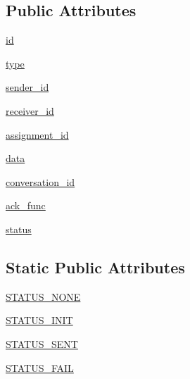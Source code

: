 \subsection*{Public Attributes}
\begin{DoxyCompactItemize}
\item 
\hyperlink{classparlai_1_1mturk_1_1core_1_1dev_1_1socket__manager_1_1Packet_a451091aed811f2901c213986fc86d020}{id}
\item 
\hyperlink{classparlai_1_1mturk_1_1core_1_1dev_1_1socket__manager_1_1Packet_acc5963f125182087b623a3adde523c89}{type}
\item 
\hyperlink{classparlai_1_1mturk_1_1core_1_1dev_1_1socket__manager_1_1Packet_a3095d75963017368974bd34c3aacfe8c}{sender\+\_\+id}
\item 
\hyperlink{classparlai_1_1mturk_1_1core_1_1dev_1_1socket__manager_1_1Packet_af453648a5280b925750d4305dcd2404a}{receiver\+\_\+id}
\item 
\hyperlink{classparlai_1_1mturk_1_1core_1_1dev_1_1socket__manager_1_1Packet_ae1819bd7ee66a1e798fbfd091ebf060e}{assignment\+\_\+id}
\item 
\hyperlink{classparlai_1_1mturk_1_1core_1_1dev_1_1socket__manager_1_1Packet_a55eb8eaaff74df589a544a1133434bac}{data}
\item 
\hyperlink{classparlai_1_1mturk_1_1core_1_1dev_1_1socket__manager_1_1Packet_a4214fa53d6892dbfaa37cf6e3503f945}{conversation\+\_\+id}
\item 
\hyperlink{classparlai_1_1mturk_1_1core_1_1dev_1_1socket__manager_1_1Packet_a8a1db141ef73f663d032aa493825b4a2}{ack\+\_\+func}
\item 
\hyperlink{classparlai_1_1mturk_1_1core_1_1dev_1_1socket__manager_1_1Packet_a322b2711fac3332dc676f1d7d3b04a35}{status}
\end{DoxyCompactItemize}
\subsection*{Static Public Attributes}
\begin{DoxyCompactItemize}
\item 
\hyperlink{classparlai_1_1mturk_1_1core_1_1dev_1_1socket__manager_1_1Packet_ac376411557dc210237bd5d0d19699627}{S\+T\+A\+T\+U\+S\+\_\+\+N\+O\+NE}
\item 
\hyperlink{classparlai_1_1mturk_1_1core_1_1dev_1_1socket__manager_1_1Packet_af742ed7464b244f1acbaced40e9d868c}{S\+T\+A\+T\+U\+S\+\_\+\+I\+N\+IT}
\item 
\hyperlink{classparlai_1_1mturk_1_1core_1_1dev_1_1socket__manager_1_1Packet_aa86e048363155438881eef8fd23e8ea6}{S\+T\+A\+T\+U\+S\+\_\+\+S\+E\+NT}
\item 
\hyperlink{classparlai_1_1mturk_1_1core_1_1dev_1_1socket__manager_1_1Packet_a7b0e2e95917a1e2a5cb98bb31ab5f9fa}{S\+T\+A\+T\+U\+S\+\_\+\+F\+A\+IL}
\end{DoxyCompactItemize}


